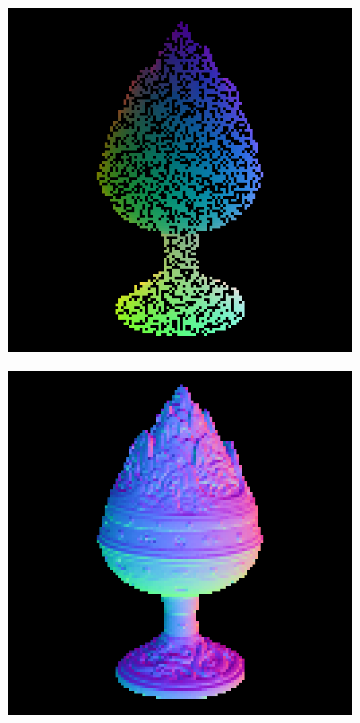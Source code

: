 \begin{figure}
	\centering
	\begin{subfigure}[b]{0.24\linewidth}
		\includegraphics[width=\linewidth]{./Figures/gcnn_synthetic/fancy_eval_2_point_cloud_noise.png}
	\end{subfigure}
	\begin{subfigure}[b]{0.24\linewidth}
		\includegraphics[width=\linewidth]{./Figures/gcnn_synthetic/fancy_eval_2_groundtruth.png}

\end{subfigure}
\end{figure}
